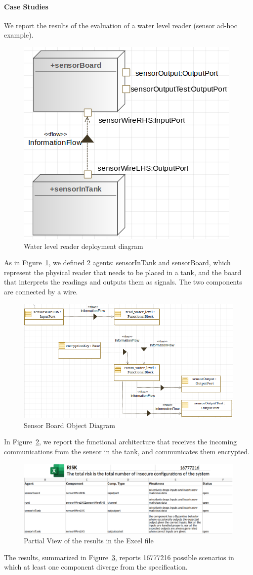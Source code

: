 \documentclass[conference]{IEEEtran}
\begin{document}
\paragraph{Case Studies}
We report the results of the evaluation of a water level reader (sensor ad-hoc example). 
\begin{figure}
	\centering
	\includegraphics[width=.5\columnwidth]{eng_cs1.png}
	\caption{Water level reader deployment diagram}
	\label{fig:eng_cs1}
\end{figure}
As in Figure~\ref{fig:eng_cs1}, we defined 2 agents: sensorInTank and sensorBoard,
which represent the physical reader that needs to be placed in a tank, and 
the board that interprets the readings and outputs them as signals.
The two components are connected by a wire.
\begin{figure}
	\centering
	\includegraphics[width=.9\columnwidth]{internal_cs1.png}
	\caption{Sensor Board Object Diagram}
	\label{fig:int_cs1}
\end{figure}
In Figure~\ref{fig:int_cs1}, we report the functional architecture that
receives the incoming communications from the sensor in the tank, and 
communicates them encrypted.
\begin{figure}
	\centering
	\includegraphics[width=.7\textwidth]{results_excel.pdf}
	\caption{Partial View of the results in the Excel file}
	\label{fig:results}
\end{figure}
The results, summarized in Figure~\ref{fig:results}, reports 16777216
possible scenarios in which at least one component diverge from the specification.
\end{document}
